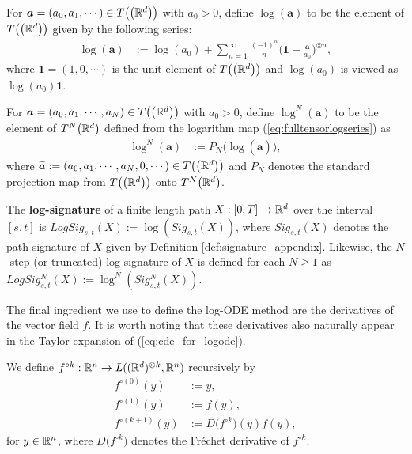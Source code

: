 \begin{definition}\label{def:tensor_log} For $\boldsymbol{a} = (a_{0}, a_{1}, \cdots) \in T\big(\big(\mathbb{R}^{d}\big)\big)$ with $a_{0} > 0$, define $\log(\boldsymbol{a})$ to be the element of $T\big(\big(\mathbb{R}^{d}\big)\big)$ given by the following series:
\begin{align}
\log(\boldsymbol{a})  & := \log(a_{0}) + \sum_{n=1}^{\infty}\frac{(-1)^{n}}{n}\bigg(\boldsymbol{1} - \frac{\boldsymbol{a}}{a_{0}}\bigg)^{\otimes n},\label{eq:fulltensorlogseries}
\end{align}
where $\boldsymbol{1} = (1, 0, \cdots)$ is the unit element of $T\big(\big(\mathbb{R}^{d}\big)\big)$ and $\log(a_{0})$ is viewed as $\log(a_{0})\boldsymbol{1}$.
\end{definition}
\begin{definition} For $\boldsymbol{a} = (a_{0}, a_{1}, \cdots, a_N) \in T\big(\big(\mathbb{R}^{d}\big)\big)$ with $a_{0} > 0$, define $\log^N(\boldsymbol{a})$ to be the element of $T^N\big(\mathbb{R}^d\big)$ defined from the logarithm map (\ref{eq:fulltensorlogseries}) as
\begin{align}
\log^N(\boldsymbol{a})  & := P_N\big(\log(\boldsymbol{\widetilde{a}})\big),\label{eq:trunctensorlogseries}
\end{align}
where $\boldsymbol{\widetilde{a}} := (a_{0}, a_{1}, \cdots, a_N, 0, \cdots)\in T\big(\big(\mathbb{R}^{d}\big)\big)$ and $P_N$ denotes the standard projection map from $T\big(\big(\mathbb{R}^{d}\big)\big)$ onto $T^N\big(\mathbb{R}^d\big)$.
\end{definition}

\begin{definition}\label{def:logsig_appendix}The \textbf{log-signature} of a finite length path $X : [0,T]\rightarrow\mathbb{R}^d$ over the interval $[s,t]$ is $LogSig_{s,t}(X) := \log(Sig_{s,t}(X))$, where $Sig_{s,t}(X)$ denotes the path signature of $X$ given by Definition \ref{def:signature_appendix}.
Likewise, the $N$-step (or truncated) log-signature of $X$ is defined for each $N\geq 1$ as $LogSig_{s,t}^N(X) := \log^N(Sig_{s,t}^N(X))$.
\end{definition}

The final ingredient we use to define the log-ODE method are the derivatives of the vector field $f$.
It is worth noting that these derivatives also naturally appear in the Taylor expansion of (\ref{eq:cde_for_logode}).

\begin{definition}\label{def:vect_derivative} We define $f^{\circ k} : \mathbb{R}^n\rightarrow L((\mathbb{R}^d)^{\otimes k}, \mathbb{R}^n)$ recursively by
\begin{align*}
f^{\circ (0)}(y) & := y,\\
f^{\circ (1)}(y) & := f(y),\\
f^{\circ (k + 1)}(y) & := D\big(f^{\circ k}\big)(y)f(y),
\end{align*}
for $y\in\mathbb{R}^n$, where $D\big(f^{\circ k}\big)$ denotes the Fr\'{e}chet derivative of $f^{\circ k}$.
\end{definition}

